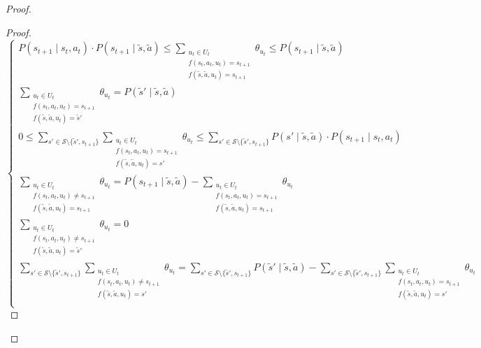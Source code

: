 \begin{proof}
\begin{proof}
 \[
    \begin{cases}
        P(s_{t+1} \mid s_t, a_t) \cdot P(s_{t+1} \mid \tilde{s}, \tilde{a}) \leq \sum_{\substack{u_t \in U_t \\f(s_t, a_t, u_t) = s_{t+1} \\ f(\tilde{s}, \tilde{a}, u_t) = s_{t+1}}}{\theta_{u_t}} \leq P(s_{t+1} \mid \tilde{s}, \tilde{a}) \\
        \sum_{\substack{u_t \in U_t \\f(s_t, a_t, u_t) = s_{t+1} \\ f(\tilde{s}, \tilde{a}, u_t) = \tilde{s}'}}{\theta_{u_t}} = P(\tilde{s}' \mid \tilde{s}, \tilde{a})\\
        0 \leq \sum_{s' \in \mathcal{S}\setminus\{\tilde{s}', s_{t+1}\}}\sum_{\substack{u_t \in U_t \\f(s_t, a_t, u_t) = s_{t+1} \\ f(\tilde{s}, \tilde{a}, u_t) = s'}}{\theta_{u_t}} \leq \sum_{s' \in \mathcal{S}\setminus\{\tilde{s}', s_{t+1}\}}P(s' \mid \tilde{s}, \tilde{a}) \cdot P(s_{t+1} \mid s_t, a_t)\\
        \sum_{\substack{u_t \in U_t \\f(s_t, a_t, u_t) \neq s_{t+1} \\ f(\tilde{s}, \tilde{a}, u_t) = s_{t+1}}}{\theta_{u_t}} = P(s_{t+1} \mid \tilde{s}, \tilde{a}) - \sum_{\substack{u_t \in U_t \\f(s_t, a_t, u_t) = s_{t+1} \\ f(\tilde{s}, \tilde{a}, u_t) = s_{t+1}}}{\theta_{u_t}} \\
        \sum_{\substack{u_t \in U_t \\f(s_t, a_t, u_t) \neq s_{t+1} \\ f(\tilde{s}, \tilde{a}, u_t) = \tilde{s}'}}{\theta_{u_t}} = 0\\
        \sum_{s' \in \mathcal{S}\setminus\{\tilde{s}', s_{t+1}\}}\sum_{\substack{u_t \in U_t \\f(s_t, a_t, u_t) \neq s_{t+1} \\ f(\tilde{s}, \tilde{a}, u_t) = s'}}{\theta_{u_t}} = \sum_{s' \in \mathcal{S}\setminus\{\tilde{s}', s_{t+1}\}}P(\tilde{s}' \mid \tilde{s}, \tilde{a}) - \sum_{s' \in \mathcal{S}\setminus\{\tilde{s}', s_{t+1}\}}\sum_{\substack{u_t \in U_t \\f(s_t, a_t, u_t) = s_{t+1} \\ f(\tilde{s}, \tilde{a}, u_t) = s'}}{\theta_{u_t}}\\
    \end{cases}
\]


\end{proof}
\end{proof}
